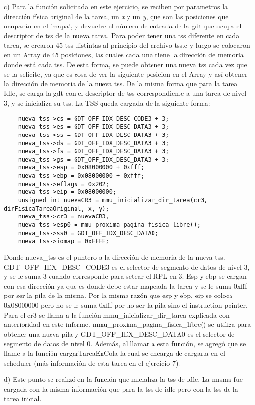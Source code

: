 \documentclass[a4paper]{article}
\begin{document}
c) Para la función solicitada en este ejercicio, se reciben por parametros la dirección física original de la tarea, un \textit{x} y un \textit{y}, que son las posiciones que ocuparán
en el 'mapa', y devuelve el número de entrada de la gdt que ocupa el descriptor de tss de la nueva tarea.
Para poder tener una tss diferente en cada tarea, se crearon 45 tss distintas al principio del archivo tss.c y luego se colocaron en un Array de 45 posiciones, las cuales cada una tiene
la dirección de memoria donde está cada tss. De esta forma, se puede obtener una nueva tss cada vez que se la solicite, ya que es cosa de ver la siguiente posicion en el Array y así obtener la dirección
de memoria de la nueva tss.
De la misma forma que para la tarea Idle, se carga la gdt con el descriptor de tss correspondiente a una tarea de nivel 3, y se inicializa su tss. La TSS queda cargada de la siguiente forma:
\begin{verbatim}
	nueva_tss->cs = GDT_OFF_IDX_DESC_CODE3 + 3;
	nueva_tss->es = GDT_OFF_IDX_DESC_DATA3 + 3;
	nueva_tss->ss = GDT_OFF_IDX_DESC_DATA3 + 3;
	nueva_tss->ds = GDT_OFF_IDX_DESC_DATA3 + 3;
	nueva_tss->fs = GDT_OFF_IDX_DESC_DATA3 + 3;
	nueva_tss->gs = GDT_OFF_IDX_DESC_DATA3 + 3;
	nueva_tss->esp = 0x08000000 + 0xfff;
	nueva_tss->ebp = 0x08000000 + 0xfff;
	nueva_tss->eflags = 0x202;
	nueva_tss->eip = 0x08000000;
	unsigned int nuevaCR3 = mmu_inicializar_dir_tarea(cr3, dirFisicaTareaOriginal, x, y);
	nueva_tss->cr3 = nuevaCR3;
	nueva_tss->esp0 = mmu_proxima_pagina_fisica_libre();
	nueva_tss->ss0 = GDT_OFF_IDX_DESC_DATA0;
	nueva_tss->iomap = 0xFFFF;
\end{verbatim}
Donde nueva_tss es el puntero a la dirección de memoria de la nueva tss. GDT_OFF_IDX_DESC_CODE3 es el selector de segmento de datos de nivel 3, y se le suma 3 cuando corresponde
para setear el RPL en 3. Esp y ebp se cargan con esa dirección ya que es donde debe estar mapeada la tarea y se le suma 0xfff por ser la pila de la misma. Por la misma razón que esp y ebp, eip se coloca 0x08000000
pero no se le suma 0xfff por no ser la pila sino el instruction pointer. Para el cr3 se llama a la función mmu_inicializar_dir_tarea explicada con anterioridad en este informe.
mmu_proxima_pagina_fisica_libre() se utiliza para obtener una nueva pila y GDT_OFF_IDX_DESC_DATA0 es el selector de segmento de datos de nivel 0.
Además, al llamar a esta función, se agregó que se llame a la función cargarTareaEnCola la cual se encarga de cargarla en el scheduler (más información de esta tarea en el ejercicio 7).

d) Este punto se realizó en la función que inicializa la tss de idle. La misma fue cargada con la misma información que para la tss de idle pero con la tss de la tarea inicial.
\end{document}
